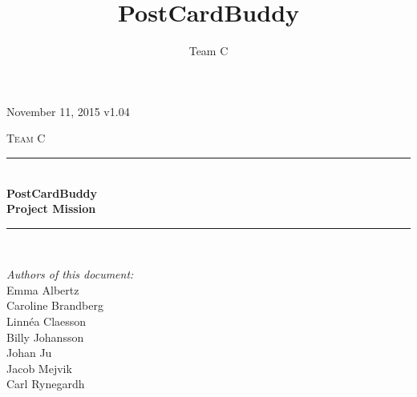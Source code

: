 \documentclass[10pt,a4paper]{article}
\title{PostCardBuddy}
\author{Team C}
\begin{document}
\begin{titlepage}
\newcommand{\HRule}{\rule{\linewidth}{0.5mm}}


\begin{flushright}
November 11, 2015 v1.04\\[3cm]
\end{flushright}


\centering
\textsc{\LARGE Team C}\\[0.5cm]

\HRule \\[0.4cm]
{ \huge \bfseries PostCardBuddy}\\[0.3cm]
{\Large \bfseries Project Mission}\\[0.4cm] %
\HRule \\[1.5cm]

\vfill
\begin{flushleft}
\textit{Authors of this document:}\\
Emma Albertz\\
Caroline Brandberg\\
Linnéa Claesson\\
Billy Johansson\\
Johan Ju\\
Jacob Mejvik\\
Carl Rynegardh
\end{flushleft}

\end{titlepage}



%



\setcounter{tocdepth}{2}
\tableofcontents
\newpage
{}




\end{document}
